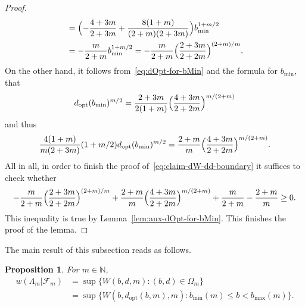 \documentclass[a4paper]{amsart} %
\newtheorem{proposition}[theorem]{Proposition} %
\theoremstyle{definition}
\theoremstyle{remark}
\numberwithin{equation}{section}
\newcommand*{\NNone}{\mathbb{N}}
\newcommand*{\weakconstrestricted}[2]{w(#1|#2)} %
\newcommand*{\fclassspec}[1]{\mathcal{F}_{#1}}
\newcommand*{\specialbd}[1]{\Omega_{#1}}
\newcommand*{\XXXspecialbd}{W}
\newcommand*{\bMin}{b_{\min}}
\newcommand*{\bMax}{b_{\max}}
\newcommand*{\dOpt}{d_{\mathrm{opt}}}
\begin{document}
\begin{proof}
\begin{align*}
	&=\Bigl( - \frac{4+3m}{2+3m} + \frac{8(1+m)}{(2+m)(2+3m)}\Bigr)\bMin^{1+m/2} \\
	&= -\frac{m}{2+m}\bMin^{1+m/2}
	= -\frac{m}{2+m}\Bigl(\frac{2+3m}{2+2m}\Bigr)^{(2+m)/m} .
	\end{align*}
	On the other hand, it follows from~\eqref{eq:dOpt-for-bMin}
	and the formula for $\bMin$,
	that
	\[
	\dOpt(\bMin)^{m/2} = \frac{2+3m}{2(1+m)} \Bigl( \frac{4+3m}{2+2m}\Bigr)^{m/(2+m)}
	\]
	and thus
	\begin{equation*}
	\frac{4(1+m)}{m(2+3m)}(1+m/2)\dOpt(\bMin)^{m/2}
	=\frac{2+m}{m}\Bigl(\frac{4+3m}{2+2m}\Bigr)^{m/(2+m)} .
	\end{equation*}
	All in all, in order to finish the proof of~\eqref{eq:claim-dW-dd-boundary}
	it suffices to check whether
	\[
	-\frac{m}{2+m}\Bigl(\frac{2+3m}{2+2m}\Bigr)^{(2+m)/m} + \frac{2+m}{m}\Bigl(\frac{4+3m}{2+2m}\Bigr)^{m/(2+m)}
	+ \frac{m}{2+m} - \frac{2+m}{m} \geq 0.
	\]
	This inequality is true by Lemma~\ref{lem:aux-dOpt-for-bMin}.
	This finishes the proof of the lemma.
\end{proof}
The main result of this subsection reads as follows.


\begin{proposition}
	\label{prop:lower-bound-fixed-m-special-b-c-d}
	For $m\in\NNone$,
	\begin{align*}
	\weakconstrestricted{\Lambda_m}{\fclassspec{m}} 
	&=  
	\sup\bigl\{
	\XXXspecialbd(b,d,m) : (b,d)\in\specialbd{m} \bigr\}\\
	&= 	\sup\bigl\{
	\XXXspecialbd(b,\dOpt(b,m),m) : \bMin(m) \leq b < \bMax(m) \bigr\}.	
	\end{align*}
\end{proposition}
\end{document}
